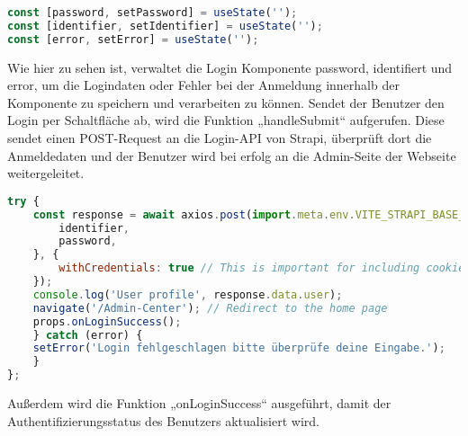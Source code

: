 \begin{lstlisting}[language=JavaScript, caption={Login.jsx states}, label={lst:loginjsxStates}]
const [password, setPassword] = useState('');
const [identifier, setIdentifier] = useState('');
const [error, setError] = useState('');
\end{lstlisting}

Wie hier zu sehen ist, verwaltet die Login Komponente password, identifiert und error, um die Logindaten oder Fehler bei der Anmeldung innerhalb der Komponente zu speichern und verarbeiten zu können.
Sendet der Benutzer den Login per Schaltfläche ab, wird die Funktion „handleSubmit“ aufgerufen. Diese sendet einen POST-Request an die Login-API von Strapi, überprüft dort die Anmeldedaten und der Benutzer wird bei erfolg an die Admin-Seite der Webseite weitergeleitet.

\begin{lstlisting}[language=JavaScript, caption={Login.jsx Login-Funktion}, label={lst:loginjsxLoginFunktion}]
try {
    const response = await axios.post(import.meta.env.VITE_STRAPI_BASE_URL+'api/auth/login', {
        identifier,
        password,
    }, {
        withCredentials: true // This is important for including cookies in the request
    });
    console.log('User profile', response.data.user);
    navigate('/Admin-Center'); // Redirect to the home page
    props.onLoginSuccess();
    } catch (error) {
    setError('Login fehlgeschlagen bitte überprüfe deine Eingabe.');
    }
};
\end{lstlisting}

Außerdem wird die Funktion „onLoginSuccess“ ausgeführt, damit der Authentifizierungsstatus des Benutzers aktualisiert wird.